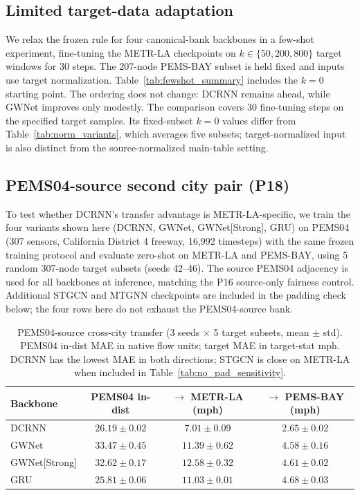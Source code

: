 \subsection{Limited target-data adaptation}
\label{sec:appendix_fewshot}

We relax the frozen rule for four canonical-bank backbones in a few-shot experiment, fine-tuning the METR-LA checkpoints on $k\in\{50,200,800\}$ target
windows for 30 steps. The 207-node PEMS-BAY subset is held fixed and inputs
use target normalization. Table~\ref{tab:fewshot_summary} includes the
$k=0$ starting point. The ordering does not change: DCRNN remains ahead,
while GWNet improves only modestly. The comparison covers 30 fine-tuning steps on the specified target samples.
Its fixed-subset $k=0$ values differ from Table~\ref{tab:norm_variants},
which averages five subsets; target-normalized input is also distinct from
the source-normalized main-table setting.



\subsection{PEMS04-source second city pair (P18)}
\label{sec:appendix_pems04}

To test whether DCRNN's transfer advantage is METR-LA-specific, we train the
four variants shown here (DCRNN, GWNet, GWNet[Strong], GRU) on PEMS04~\citep{guo2019astgcn}
(307 sensors, California District 4 freeway, 16{,}992 timesteps) with the same frozen
training protocol and evaluate zero-shot on METR-LA and PEMS-BAY, using 5 random
307-node target subsets (seeds 42--46). The source PEMS04 adjacency is used for all
backbones at inference, matching the P16 source-only fairness control. Additional
STGCN and MTGNN checkpoints are included in the padding check below; the four
rows here do not exhaust the PEMS04-source bank.

\begin{table}[h]
\centering
\caption{PEMS04-source cross-city transfer (3 seeds $\times$ 5 target subsets, mean $\pm$ std).
PEMS04 in-dist MAE in native flow units; target MAE in target-stat mph.
DCRNN has the lowest MAE in both directions; STGCN is close on METR-LA
when included in Table~\ref{tab:no_pad_sensitivity}.}
\label{tab:pems04_cross_city}
\vskip 0.1in
\small
\begin{tabular}{lccc}
\toprule
\textbf{Backbone} & \textbf{PEMS04 in-dist} & \textbf{$\to$ METR-LA (mph)} & \textbf{$\to$ PEMS-BAY (mph)} \\
\midrule
DCRNN         & $26.19 \pm 0.02$ & $\mathbf{7.01 \pm 0.09}$ & $\mathbf{2.65 \pm 0.02}$ \\
GWNet         & $33.47 \pm 0.45$ & $11.39 \pm 0.62$ & $4.58 \pm 0.16$ \\
GWNet[Strong] & $32.62 \pm 0.17$ & $12.58 \pm 0.32$ & $4.61 \pm 0.02$ \\
GRU           & $25.81 \pm 0.06$ & $11.03 \pm 0.01$ & $4.68 \pm 0.03$ \\
\bottomrule
\end{tabular}
\end{table}

